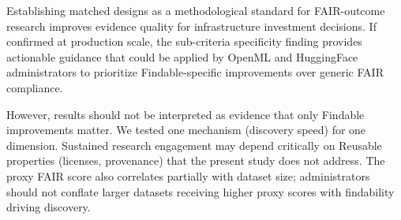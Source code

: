 Establishing matched designs as a methodological standard for FAIR-outcome research improves evidence quality for infrastructure investment decisions. If confirmed at production scale, the sub-criteria specificity finding provides actionable guidance that could be applied by OpenML and HuggingFace administrators to prioritize Findable-specific improvements over generic FAIR compliance.

However, results should not be interpreted as evidence that only Findable improvements matter. We tested one mechanism (discovery speed) for one dimension. Sustained research engagement may depend critically on Reusable properties (licenses, provenance) that the present study does not address. The proxy FAIR score also correlates partially with dataset size; administrators should not conflate larger datasets receiving higher proxy scores with findability driving discovery.

